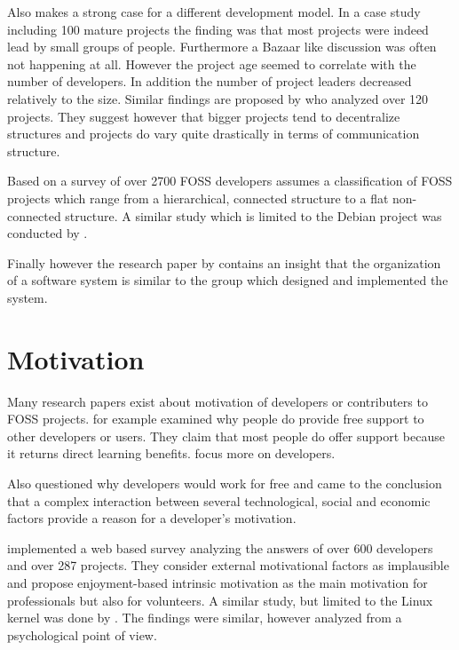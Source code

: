 Also \textcite{Krishnamurthy2002} makes a strong case for a different
development model. In a case study including 100 mature projects the finding
was that most projects were indeed lead by small groups of people. Furthermore
a Bazaar like discussion was often not happening at all. However the project
age seemed to correlate with the number of developers. In addition the number
of project leaders decreased relatively to the size. Similar findings are
proposed by \textcite{Crowston2005a} who analyzed over 120 projects. They
suggest however that bigger projects tend to decentralize structures and
projects do vary quite drastically in terms of communication structure.

Based on a survey of over 2700 \ac{FOSS} developers \textcite{Ghosh2005}
assumes a classification of \ac{FOSS} projects which range from a hierarchical,
connected structure to a flat non-connected structure. A similar study which is
limited to the Debian project was conducted by \textcite{Sadowski2008}.

Finally however the research paper by \textcite{Conway1968} contains an insight
that the organization of a software system is similar to the group which
designed and implemented the system.


\section{Motivation} %

Many research papers exist about motivation of developers or contributers to
\ac{FOSS} projects. \textcite{Lakhani2002} for example examined why people do
provide free support to other developers or users. They claim that most people
do offer support because it returns direct learning benefits.
\textcite{Lerner2000} focus more on developers.

Also \textcite{Grazzini2009} questioned why developers would work for free and
came to the conclusion that a complex interaction between several
technological, social and economic factors provide a reason for a developer's
motivation.

\textcite{Lakhani2003} implemented a web based survey analyzing the answers of
over 600 developers and over 287 projects. They consider external motivational
factors as implausible and propose enjoyment-based intrinsic motivation as the
main motivation for professionals but also for volunteers. A similar study, but
limited to the Linux kernel was done by \textcite{Hertel2003}. The findings
were similar, however analyzed from a psychological point of view.

